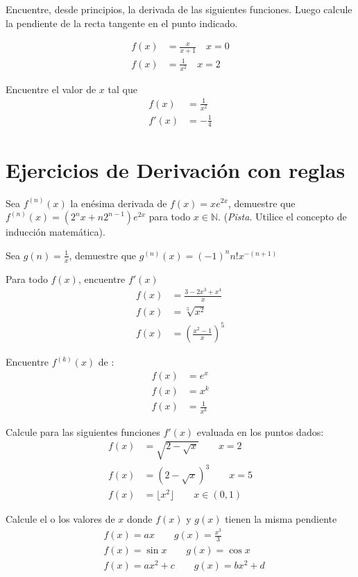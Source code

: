 \documentclass[spanish,12pt]{article}
\begin{document}
Encuentre, desde principios, la derivada de las siguientes funciones. Luego calcule la pendiente de la recta tangente en el punto indicado.

\begin{align*}
    f(x) &=\frac{x}{x+1} \quad x=0\\
    f(x) &=\frac{1}{x^2} \quad x=2
\end{align*}

Encuentre el valor de $x$ tal que 
\begin{align*}
    f(x)&=\frac{1}{x^2}\\
    f'(x)&=-\frac{1}{4}
\end{align*}

\section{Ejercicios de Derivación con reglas}
Sea $f^{(n)}(x)$ la enésima derivada de $f(x)=xe^{2x}$, demuestre que $f^{(n)}(x)= (2^nx+n2^{n-1})e^{2x}$ para todo $x \in \mathbb{N}$. (\textit{Pista}. Utilice el concepto de inducción matemática).

Sea $g(n)= \frac{1}{x}$, demuestre que $g^{(n)}(x)= (-1)^nn!x^{-(n+1)}$ 

Para todo $f(x)$, encuentre $f'(x)$
\begin{align*}
    f(x)&= \frac{3-2x^3+x^4}{x}\\
    f(x)&= \sqrt[5]{x^2}\\
    f(x)&= \left(\frac{x^2-1}{x}\right)^5
\end{align*}

Encuentre $f^{(k)}(x)$ de :
\begin{align*}
    f(x)&= e^x\\
    f(x)&= x^k\\
    f(x)&= \frac{1}{x^k}
\end{align*}

Calcule para las siguientes funciones $f'(x)$ evaluada en los puntos dados:
\begin{align*}
    f(x)&= \sqrt{2-\sqrt{x}}\quad\quad x=2\\
    f(x)&= (2-\sqrt{x})^3\quad\quad x=5\\
    f(x)&= \lfloor x^2\rfloor \quad\quad x\in (0,1)
\end{align*}

Calcule el o los valores de $x$ donde $f(x)$ y $g(x)$ tienen la misma pendiente
\begin{align*}
    &f(x)=ax\quad\quad g(x)=\frac{x^3}{3}\tag{¿Para que valores de $a$ pueden tener la misma pendiente?}\\
    &f(x)=\sin{x} \quad\quad g(x)=\cos{x}\tag{$x \in [0,2\pi]$}\\
    &f(x)=ax^2+c \quad\quad g(x)=bx^2+d \tag{$a\neq b\neq 0$}
\end{align*}
\end{document}
